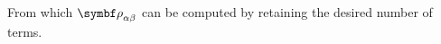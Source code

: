 From which $\rotv[]{\alpha}{\beta}$ can be computed by retaining the desired number of terms.

\begin{comment}
\subsection{Rotation Matrix to Axis-Angle}
Given a rotation matrix $\RotM{\alpha}{\beta}$, to extract the rotation axis $\vrel{\rotax}{\alpha}{\beta}$ and rotation angle $\rel{\rotang}{\alpha}{\beta}$, we proceed as follows. First, we compute  $\trace{\RotM{\alpha}{\beta}}$. Then:

\begin{itemize}
\item
If $\trace{\RotM{\alpha}{\beta}}=3$, from \eqref{E:AttRep.AxAng.Res.Tr} we see that $\cos \rel{\rotang}{\alpha}{\beta} = 1$ and therefore $\rel{\rotang}{\alpha}{\beta}=0$. This corresponds to a null rotation, so $\vrel{\rotax}{\alpha}{\beta}$ is undefined. 
\item
If $\trace{\RotM{\alpha}{\beta}}=-1$, $\cos \rel{\rotang}{\alpha}{\beta}= 0$ and therefore $\rel{\rotang}{\alpha}{\beta}=\pm \pi$ (for any given axis, $\rel{\rotang}{\alpha}{\beta}=\pi$ and $\rel{\rotang}{\alpha}{\beta}=-\pi$ both correspond to the same rotation).

Applying property \eqref{Eq.Res.V2Skew.Prod} with $\mcol{x}=\mcol{y}=\vrel{\rotax}{\alpha}{\beta}$ gives:
\begin{equation}\label{E:AttRep.AxAng.Der.RotM2AxAng1}
\vskew{\vrel{\rotax}{\alpha}{\beta}}^{2}=-\norm{\vrel{\rotax}{\alpha}{\beta}}^{2} \IdM + \vrel{\rotax}{\alpha}{\beta} \tr{\vrel{\rotax}{\alpha}{\beta}}=- \IdM + \vrel{\rotax}{\alpha}{\beta} \tr{\vrel{\rotax}{\alpha}{\beta}}
\end{equation}

Setting $\rel{\rotang}{\alpha}{\beta}=\pm \pi$ in \eqref{Eq.Res.RotMat.AxisAngle.Operator} and inserting \eqref{E:AttRep.AxAng.Der.RotM2AxAng1} yields:
\begin{equation}\label{E:AttRep.AxAng.Der.RotM2AxAng2}
\RotM{\alpha}{\beta} + \IdM = 2 \vrel{\rotax}{\alpha}{\beta} \tr{\vrel{\rotax}{\alpha}{\beta}} = 2 \matenv
{
{\crel{\rotax}{\alpha}{\beta}{1}}^2 								& \crel{\rotax}{\alpha}{\beta}{1} \crel{\rotax}{\alpha}{\beta}{2} 	& {\crel{\rotax}{\alpha}{\beta}{1}} \crel{\rotax}{\alpha}{\beta}{3} \\ 
\crel{\rotax}{\alpha}{\beta}{1} \crel{\rotax}{\alpha}{\beta}{2} 	& {\crel{\rotax}{\alpha}{\beta}{2}}^2 								& \crel{\rotax}{\alpha}{\beta}{2} \crel{\rotax}{\alpha}{\beta}{3} \\ 
\crel{\rotax}{\alpha}{\beta}{1} \crel{\rotax}{\alpha}{\beta}{3} 	& \crel{\rotax}{\alpha}{\beta}{2} \crel{\rotax}{\alpha}{\beta}{3} 	& {\crel{\rotax}{\alpha}{\beta}{3}}^2
}
\end{equation}


\end{comment}
